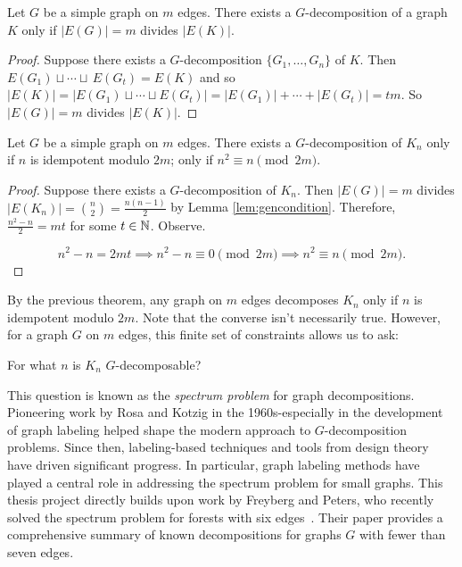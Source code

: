 \begin{lemma} \label{lem:gencondition}
  Let $G$ be a simple graph on $m$ edges. There exists a $G$-decomposition of a graph $K$ only if $|E(G)|=m$ divides $|E(K)|$. 
\end{lemma}

  \begin{proof}
  Suppose there exists a $G$-decomposition $\{G_{1},\hdots, G_{n}\}$ of $K$. Then $E(G_{1})\sqcup \cdots \sqcup\,E(G_{t})=E(K)$ and so $|E(K)|=|E(G_{1})\sqcup \cdots \sqcup E(G_{t})|=|E(G_{1})|+ \cdots + |E(G_{t})|=tm$. So $|E(G)|=m$ divides $|E(K)|$.
  \end{proof}

\begin{thm} \label{thm:Kncondition}
  Let $G$ be a simple graph on $m$ edges. There exists a $G$-decomposition of $K_{n}$ only if $n$ is idempotent modulo $2m$; only if $n^{2}\equiv n\pmod{2m}$.
\end{thm}

\begin{proof}
  Suppose there exists a $G$-decomposition of $K_{n}$. Then $|E(G)|=m$ divides $|E(K_{n})|=\binom{n}{2}=\frac{n(n-1)}{2}$ by Lemma \ref{lem:gencondition}. Therefore, $\frac{n^{2}-n}{2}=mt$ for some $t\in \mathbb{N}$. Observe.

  $$n^{2}-n= 2mt\implies n^{2}-n\equiv 0\pmod{2m}\implies n^{2}\equiv n\pmod{2m}.$$
\end{proof}
By the previous theorem, any graph on $m$ edges decomposes $K_{n}$ only if $n$ is idempotent modulo $2m$. Note that the converse isn't necessarily true. However, for a graph $G$ on $m$ edges, this finite set of constraints allows us to ask:
\begin{center}
For what $n$ is $K_{n}$ $G$-decomposable?
\end{center}
This question is known as the \textit{spectrum problem} for graph decompositions. Pioneering work by Rosa and Kotzig in the 1960s-especially in the development of graph labeling helped shape the modern approach to $G$-decomposition problems. Since then, labeling-based techniques and tools from design theory have driven significant progress. In particular, graph labeling methods have played a central role in addressing the spectrum problem for small graphs. This thesis project directly builds upon work by Freyberg and Peters, who recently solved the spectrum problem for forests with six edges~\cite{FreybergPeters2024}. Their paper provides a comprehensive summary of known decompositions for graphs $G$ with fewer than seven edges.

